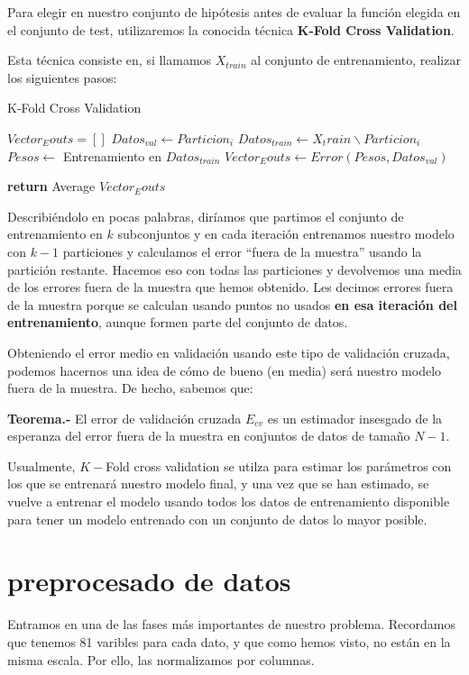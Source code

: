 \documentclass[a4paper, 20pt]{article}
\begin{document}
Para elegir en nuestro conjunto de hipótesis antes de evaluar la función elegida en el conjunto de test, utilizaremos la conocida técnica \textbf{K-Fold Cross Validation}.

Esta técnica consiste en, si llamamos $X_{train}$ al conjunto de entrenamiento, realizar los siguientes pasos:
\begin{algorithm}[H]
  \SetAlgoLined
  \caption{K-Fold Cross Validation}
  \begin{algorithmic}[1]
  \State $Vector_Eouts = []$
    \State $ Datos_{val} \gets Particion_i$
    \State $ Datos_{train} \gets X_train \backslash Particion _i$
    \State $ Pesos \gets $ Entrenamiento en $Datos_{train}$
    \State $ Vector_Eouts \gets Error(Pesos, Datos_{val})$

  \EndFor

  \State \textbf{return} Average $Vector_Eouts$
  
  \end{algorithmic}
\end{algorithm}

Describiéndolo en pocas palabras, diríamos que partimos el conjunto de entrenamiento en $k$ subconjuntos y en cada iteración entrenamos nuestro modelo
con $k-1$ particiones y calculamos el error ``fuera de la muestra'' usando la partición restante. Hacemos eso con todas las particiones y devolvemos una media de
los errores fuera de la muestra que hemos obtenido. Les decimos errores fuera de la muestra porque se calculan usando puntos no usados \textbf{en esa iteración del entrenamiento},
aunque formen parte del conjunto de datos.

Obteniendo el error medio en validación usando este tipo de validación cruzada, podemos hacernos una idea de cómo de bueno (en media) será nuestro modelo fuera de la muestra. De hecho, sabemos que:

\textbf{Teorema.-} El error de validación cruzada $E_{cv}$ es un estimador insesgado de la esperanza del error fuera de la muestra en conjuntos de datos de tamaño $N-1$.

Usualmente, $K-$Fold cross validation se utilza para estimar los parámetros con los que se entrenará nuestro modelo final, y una vez que se han estimado, se vuelve a entrenar el modelo usando
todos los datos de entrenamiento disponible para tener un modelo entrenado con un conjunto de datos lo mayor posible.

\section{preprocesado de datos}

Entramos en una de las fases más importantes de nuestro problema. Recordamos que tenemos 81 varibles para cada dato, y que como hemos visto, no están en la misma escala. Por ello, las normalizamos por columnas.

\newpage
\printbibliography
\end{document}
